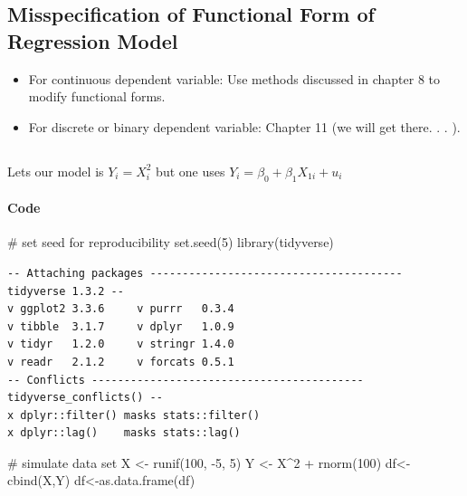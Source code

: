 \documentclass[
  letterpaper,
  DIV=11,
  numbers=noendperiod]{scrartcl}
\let\oldparagraph\paragraph
\renewcommand{\paragraph}[1]{\oldparagraph{#1}\mbox{}}
\newenvironment{Shaded}{\begin{snugshade}}{\end{snugshade}}
\newcommand{\CommentTok}[1]{\textcolor[rgb]{0.37,0.37,0.37}{#1}}
\newcommand{\DecValTok}[1]{\textcolor[rgb]{0.68,0.00,0.00}{#1}}
\newcommand{\FunctionTok}[1]{\textcolor[rgb]{0.28,0.35,0.67}{#1}}
\newcommand{\NormalTok}[1]{\textcolor[rgb]{0.00,0.23,0.31}{#1}}
\newcommand{\OtherTok}[1]{\textcolor[rgb]{0.00,0.23,0.31}{#1}}
\newcommand{\SpecialCharTok}[1]{\textcolor[rgb]{0.37,0.37,0.37}{#1}}
\providecommand{\tightlist}{%
  \setlength{\itemsep}{0pt}\setlength{\parskip}{0pt}}\usepackage{longtable,booktabs,array}
\begin{document}
\hypertarget{misspecification-of-functional-form-of-regression-model}{%
\subsection{Misspecification of Functional Form of Regression
Model}\label{misspecification-of-functional-form-of-regression-model}}

\begin{itemize}
\tightlist
\item
  For continuous dependent variable: Use methods discussed in chapter 8
  to modify functional forms.
\item
  For discrete or binary dependent variable: Chapter 11 (we will get
  there. . . ).
\end{itemize}

\hypertarget{section}{%
\subsection{}\label{section}}

Lets our model is \(Y_i = X_i^2\) but one uses
\(Y_i=\beta_0+\beta_1X_{1i}+u_i\)

\hypertarget{code}{%
\paragraph{Code}\label{code}}

\begin{Shaded}
\begin{Highlighting}[]
\CommentTok{\# set seed for reproducibility}
\FunctionTok{set.seed}\NormalTok{(}\DecValTok{5}\NormalTok{)}
\FunctionTok{library}\NormalTok{(tidyverse)}
\end{Highlighting}
\end{Shaded}

\begin{verbatim}
-- Attaching packages --------------------------------------- tidyverse 1.3.2 --
v ggplot2 3.3.6     v purrr   0.3.4
v tibble  3.1.7     v dplyr   1.0.9
v tidyr   1.2.0     v stringr 1.4.0
v readr   2.1.2     v forcats 0.5.1
-- Conflicts ------------------------------------------ tidyverse_conflicts() --
x dplyr::filter() masks stats::filter()
x dplyr::lag()    masks stats::lag()
\end{verbatim}

\begin{Shaded}
\begin{Highlighting}[]
\CommentTok{\# simulate data set}
\NormalTok{X }\OtherTok{\textless{}{-}} \FunctionTok{runif}\NormalTok{(}\DecValTok{100}\NormalTok{, }\SpecialCharTok{{-}}\DecValTok{5}\NormalTok{, }\DecValTok{5}\NormalTok{)}
\NormalTok{Y }\OtherTok{\textless{}{-}}\NormalTok{ X}\SpecialCharTok{\^{}}\DecValTok{2} \SpecialCharTok{+} \FunctionTok{rnorm}\NormalTok{(}\DecValTok{100}\NormalTok{)}
\NormalTok{df}\OtherTok{\textless{}{-}}\FunctionTok{cbind}\NormalTok{(X,Y)}
\NormalTok{df}\OtherTok{\textless{}{-}}\FunctionTok{as.data.frame}\NormalTok{(df)}
\end{Highlighting}
\end{Shaded}
\end{document}
